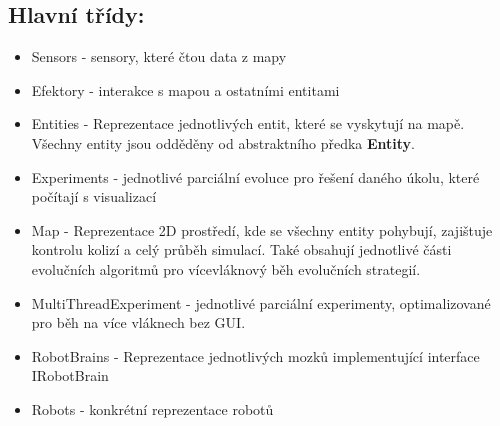 \documentclass[12pt, oneside]{article}
\begin{document}
\subsection{Hlavní třídy:}
\begin{itemize}
	\item Sensors - sensory, které čtou data z  mapy 
	\item Efektory - interakce s mapou a ostatními entitami
	\item Entities - Reprezentace jednotlivých entit, které se vyskytují na mapě. Všechny entity jsou odděděny od abstraktního předka \textbf{Entity}. 
	\item Experiments - jednotlivé parciální evoluce pro řešení daného úkolu, které počítají s visualizací
	\item Map - Reprezentace 2D prostředí, kde se všechny entity pohybují, zajištuje kontrolu kolizí a celý průběh simulací. Také obsahují jednotlivé části evolučních algoritmů pro vícevláknový běh evolučních strategií. 
	\item MultiThreadExperiment - jednotlivé parciální experimenty, optimalizované pro  běh na více vláknech bez GUI. 
	\item RobotBrains - Reprezentace jednotlivých mozků implementující interface IRobotBrain
	\item Robots - konkrétní reprezentace robotů 
\end{itemize}
\newpage
\end{document}
